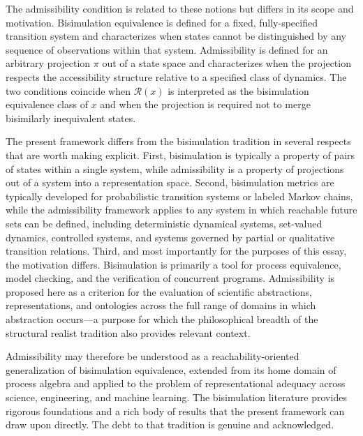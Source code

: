 \documentclass[12pt,a4paper]{article}
\theoremstyle{plain}
\theoremstyle{definition}
\theoremstyle{remark}
\begin{document}
The admissibility condition is related to these notions but differs in its
scope and motivation. Bisimulation equivalence is defined for a fixed,
fully-specified transition system and characterizes when states cannot be
distinguished by any sequence of observations within that system. Admissibility
is defined for an arbitrary projection $\pi$ out of a state space and
characterizes when the projection respects the accessibility structure relative
to a specified class of dynamics. The two conditions coincide when
$\mathcal{R}(x)$ is interpreted as the bisimulation equivalence class of $x$
and when the projection is required not to merge bisimilarly inequivalent
states.

The present framework differs from the bisimulation tradition in several
respects that are worth making explicit. First, bisimulation is typically a
property of pairs of states within a single system, while admissibility is a
property of projections out of a system into a representation space. Second,
bisimulation metrics are typically developed for probabilistic transition
systems or labeled Markov chains, while the admissibility framework applies
to any system in which reachable future sets can be defined, including
deterministic dynamical systems, set-valued dynamics, controlled systems, and
systems governed by partial or qualitative transition relations. Third, and
most importantly for the purposes of this essay, the motivation differs.
Bisimulation is primarily a tool for process equivalence, model checking, and
the verification of concurrent programs. Admissibility is proposed here as a
criterion for the evaluation of scientific abstractions, representations, and
ontologies across the full range of domains in which abstraction occurs---a
purpose for which the philosophical breadth of the structural realist tradition
\cite{ladyman2007} also provides relevant context.

Admissibility may therefore be understood as a reachability-oriented
generalization of bisimulation equivalence, extended from its home domain of
process algebra and applied to the problem of representational adequacy
across science, engineering, and machine learning. The bisimulation literature
provides rigorous foundations and a rich body of results that the present
framework can draw upon directly. The debt to that tradition is genuine and
acknowledged.
\end{document}
